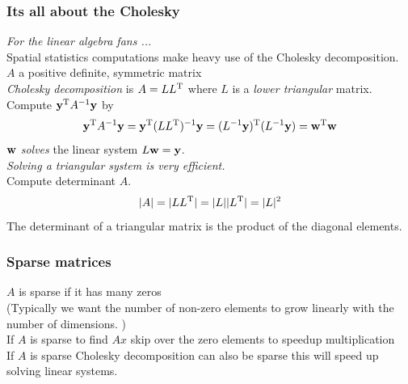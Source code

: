 \documentclass[english]{beamer} %
\def\Myspace{{\vspace*{.125in}}}
\begin{document}
\begin{frame} %
 \frametitle{Its all about the Cholesky}
 {\it For the linear algebra fans ... } \\
 Spatial statistics computations make heavy use of the Cholesky decomposition.  \\
\bdot  $A$ a positive definite, symmetric matrix \\
{\it Cholesky decomposition} is  $A= LL^{\rm T}$ where $L$  is a {\it lower triangular} matrix. \\
\Myspace
\bdot Compute  $\mathbf{y} ^{\rm T} A^{-1}  \mathbf{y}$  by 
\[ \mathbf{y} ^{\rm T} A^{-1}  \mathbf{y} = \mathbf{y} ^{\rm T} (L L^{\rm T}) ^{-1}  \mathbf{y}  = ( L ^{-1} \mathbf{y}) ^{\rm T}  (L ^{-1} \mathbf{y})
=  \mathbf{w} ^{\rm T} \mathbf{w} \]
 $\mathbf{w}$ {\it solves }  the linear system $L   \mathbf{w} = \mathbf{y} $.  \\
{\it Solving a  triangular system  is  very efficient.} \\
\Myspace
\bdot Compute determinant $A$. \[ |A| =  |L L^{\rm T} | =  |L | | L^{\rm T} | = |L|^2 \]
The determinant of a  triangular matrix is the product of the diagonal elements. 
\end{frame} %

\begin{frame} %
\frametitle{Sparse matrices}
\bdot  $A$ is sparse if it has many zeros  \\
  (Typically we want the number of non-zero elements to grow  linearly with the number of dimensions. ) \\
  \Myspace
  \bdot If $A$ is sparse to find  $Ax$  skip over the zero elements to speedup multiplication  \\
    \Myspace
 \bdot If $A$ is sparse  Cholesky decomposition can also be sparse this will speed up solving linear systems.

\end{frame}  
\end{document}
